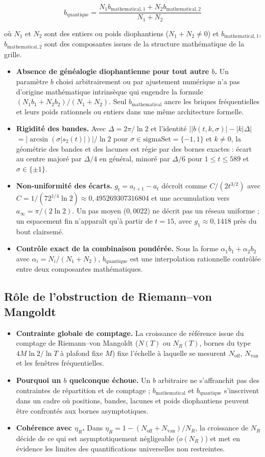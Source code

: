\documentclass[11pt,a4paper]{article}
\newcommand{\itemization}[1]{\begin{itemize}[leftmargin=1.4em,itemsep=1pt,topsep=2pt]#1\end{itemize}}
\theoremstyle{definition}
\theoremstyle{remark}
\begin{document}
\[
b_{\mathrm{quantique}} = \frac{N_1 b_{\mathrm{mathematical},1} + N_2 b_{\mathrm{mathematical},2}}{N_1 + N_2}
\]

où $N_1$ et $N_2$ sont des entiers ou poids diophantiens ($N_1 + N_2 \neq 0$) et $b_{\mathrm{mathematical},1}$, $b_{\mathrm{mathematical},2}$ sont des composantes issues de la structure mathématique de la grille.

\itemization{
\item \textbf{Absence de généalogie diophantienne pour tout autre $b$.} Un paramètre $b$ choisi arbitrairement ou par ajustement numérique n'a pas d'origine mathématique intrinsèque qui engendre la formule $(N_1 b_1 + N_2 b_2)/(N_1 + N_2)$. Seul $b_{\mathrm{mathematical}}$ ancre les briques fréquentielles et leurs poids rationnels ou entiers dans une même architecture formelle.
\item \textbf{Rigidité des bandes.} Avec $\Delta = 2\pi/\ln 2$ et l'identité $\lvert \lvert b(t,k,\sigma)\rvert - \lvert k\rvert \Delta \rvert$ $= \lvert \arcsin(\sigma \lvert s_2(t)\rvert)\rvert \allowbreak /\ln 2$ pour $\sigma \in \mathrm{sigmaSet} = \{-1,1\}$ et $k \neq 0$, la géométrie des bandes et des lacunes est régie par des bornes exactes : écart au centre majoré par $\Delta/4$ en général, minoré par $\Delta/6$ pour $1 \le t \le 589$ et $\sigma \in \{\pm 1\}$.
\item \textbf{Non-uniformité des écarts.} $g_t = a_{t+1} - a_t$ décroît comme $C/(2t^{3/2})$ avec $C = 1/(72^{1/4}\ln 2) \approx 0{,}495269307316804$ et une accumulation vers $a_\infty = \pi/(2\ln 2)$. Un pas moyen ($0{,}0022$) ne décrit pas un réseau uniforme ; un espacement fin n'apparaît qu'à partir de $t = 15$, avec $g_1 \approx 0{,}1418$ près du bout clairsemé.
\item \textbf{Contrôle exact de la combinaison pondérée.} Sous la forme $\alpha_1 b_1 + \alpha_2 b_2$ avec $\alpha_i = N_i/(N_1 + N_2)$, $b_{\mathrm{quantique}}$ est une interpolation rationnelle contrôlée entre deux composantes mathématiques.
}

\subsection{Rôle de l'obstruction de Riemann--von Mangoldt}
\itemization{
\item \textbf{Contrainte globale de comptage.} La croissance de référence issue du comptage de Riemann--von Mangoldt ($N(T)$ ou $N_R(T)$, bornes du type $4M\ln 2/\ln T$ à plafond fixe $M$) fixe l'échelle à laquelle se mesurent $N_{\mathrm{off}}$, $N_{\mathrm{van}}$ et les fenêtres fréquentielles.
\item \textbf{Pourquoi un $b$ quelconque échoue.} Un $b$ arbitraire ne s'affranchit pas des contraintes de répartition et de comptage ; $b_{\mathrm{mathematical}}$ et $b_{\mathrm{quantique}}$ s'inscrivent dans un cadre où positions, bandes, lacunes et poids diophantiens peuvent être confrontés aux bornes asymptotiques.
\item \textbf{Cohérence avec $\eta_R$.} Dans $\eta_R = 1 - (N_{\mathrm{off}} + N_{\mathrm{van}})/N_R$, la croissance de $N_R$ décide de ce qui est asymptotiquement négligeable ($o(N_R)$) et met en évidence les limites des quantifications universelles non restreintes.
}
\end{document}
